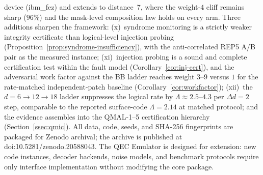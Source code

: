 \documentclass[11pt,a4paper]{article}
\begin{document}
device (ibm\_fez) and extends to distance~7, where the weight-$4$
cliff remains sharp ($96\%$) and the mask-level composition law holds
on every arm.
Three additions sharpen the framework: (x)~syndrome monitoring is a
strictly weaker integrity certificate than logical-level injection
probing (Proposition~\ref{prop:syndrome-insufficiency}), with the
anti-correlated REP5 A/B pair as the measured instance; (xi)~injection
probing is a sound and complete certification test within the fault
model (Corollary~\ref{cor:inj-cert}), and the adversarial work factor
against the BB ladder reaches weight $3$--$9$ versus $1$ for the
rate-matched independent-patch baseline (Corollary~\ref{cor:workfactor});
(xii)~the $d=6{\to}12{\to}18$ ladder suppresses the logical rate by
$\Lambda\approx2.5$--$4.3$ per $\Delta d=2$ step, comparable to the
reported surface-code $\Lambda=2.14$ at matched protocol; and the
evidence assembles into the QMAL-1--5 certification hierarchy
(Section~\ref{ssec:qmic}).
All data, code, seeds, and SHA-256 fingerprints are packaged for Zenodo archival; the archive is published at doi:10.5281/zenodo.20588043.
The QEC Emulator is designed for extension: new code instances, decoder
backends, noise models, and benchmark protocols require only interface
implementation without modifying the core package.
\end{document}
